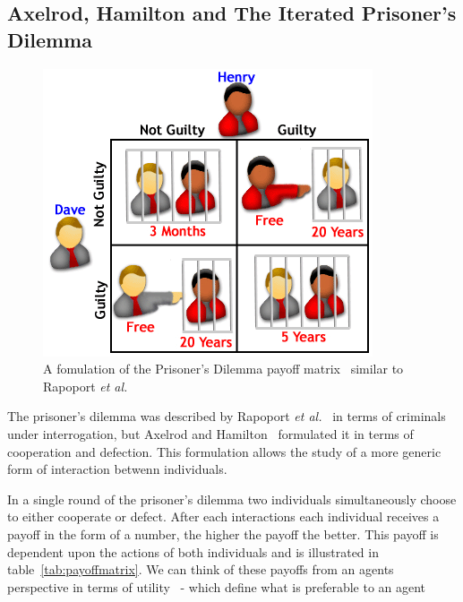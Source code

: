 \documentclass[]{final_report}
\begin{document}
\subsection{Axelrod, Hamilton and The Iterated Prisoner's Dilemma}
\label{sec:ipd}
\begin{figure}
\vspace{-20pt}
\begin{framed}
	\center
	\includegraphics[width=\textwidth]{LaymansIPD.png}
	\caption{A fomulation of the Prisoner's Dilemma payoff matrix~\cite{laymansipd} similar to Rapoport \textit{et al.}~\cite{rapoport1965prisoner}}
	\label{fig:ipdvis}
\end{framed}
\vspace{-20pt}
\end{figure}
The prisoner's dilemma was described by Rapoport \textit{et al.}~\cite{rapoport1965prisoner} in terms of criminals under interrogation, but Axelrod and Hamilton~\cite{evolution_of_cooperation} formulated it in terms of cooperation and defection. This formulation allows the study of a more generic form of interaction betwenn individuals.\par 
In a single round of the prisoner's dilemma two individuals simultaneously choose to either cooperate or defect. After each interactions each individual receives a payoff in the form of a number, the higher the payoff the better. This payoff is dependent upon the actions of both individuals and is illustrated in table~\ref{tab:payoffmatrix}. We can think of these payoffs from an agents perspective in terms of utility~\cite{wooldridge2009introduction} - which define what is preferable to an agent\par
\end{document}
